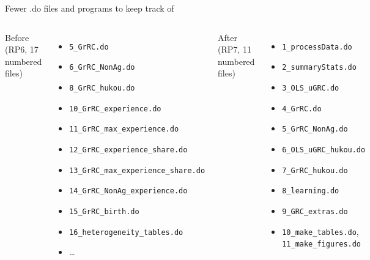 \documentclass[10pt,aspectratio=169]{beamer}
\newcommand{\code}[1]{\texttt{\small #1}}
\begin{document}
\begin{frame}{Fewer .do files and programs to keep track of}

\begin{columns}[T]
\textcolor{cktgray}{Before (RP6, 17 numbered files)}
\begin{itemize}\setlength\itemsep{0pt}
    \item \code{5\_GrRC.do}
    \item \code{6\_GrRC\_NonAg.do}
    \item \code{8\_GrRC\_hukou.do}
    \item \code{10\_GrRC\_experience.do}
    \item \code{11\_GrRC\_max\_experience.do}
    \item \code{12\_GrRC\_experience\_share.do}
    \item \code{13\_GrRC\_max\_experience\_share.do}
    \item \code{14\_GrRC\_NonAg\_experience.do}
    \item \code{15\_GrRC\_birth.do}
    \item \code{16\_heterogeneity\_tables.do}
    \item \dots
\end{itemize}

\textcolor{cktblue}{After (RP7, 11 numbered files)}
\begin{itemize}\setlength\itemsep{0pt}
    \item \code{1\_processData.do}
    \item \code{2\_summaryStats.do}
    \item \code{3\_OLS\_uGRC.do}
    \item \code{4\_GrRC.do}
    \item \code{5\_GrRC\_NonAg.do}
    \item \code{6\_OLS\_uGRC\_hukou.do}
    \item \code{7\_GrRC\_hukou.do}
    \item \code{8\_learning.do}
    \item \code{9\_GRC\_extras.do}
    \item \code{10\_make\_tables.do}, \code{11\_make\_figures.do}
\end{itemize}
\end{columns}

\end{frame}
\end{document}

